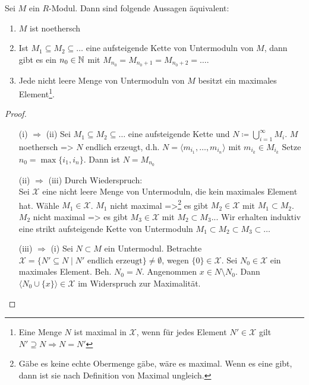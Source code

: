 \documentclass[../main.tex]{subfiles}
\begin{document}
\begin{theorem}\label{theo:5.42}
    Sei $M$ ein $R$-Modul. Dann sind folgende Aussagen äquivalent:
    \begin{enumerate}[label=(\roman*)]
        \item $M$ ist noethersch
        \item Ist $M_1\subseteq M_2\subseteq \dots$ eine aufsteigende Kette von Untermoduln von $M$, dann gibt es ein $n_0\in \mathbb{N}$ mit $M_{n_0} = M_{n_0+1} = M_{n_0+2}=\dots$.
        \item Jede nicht leere Menge von Untermoduln von $M$ besitzt ein maximales Element\footnote{Eine Menge $N$ ist maximal in $\mathcal{X}$, wenn für jedes Element $N'\in \mathcal{X}$ gilt $N'\supseteq N \Rightarrow N = N'$}.
    \end{enumerate}
\end{theorem}
\begin{proof} $ $
    \begin{itemize}
        \item[(i) $\Rightarrow$ (ii)]
        Sei $M_1\subseteq M_2\subseteq \dots$ eine aufsteigende Kette und $N\coloneqq \bigcup_{i=1}^\infty M_i$.
        $M$ noethersch => $N$ endlich erzeugt, d.h. $N=\langle m_{i_1},\dots, m_{i_n}\rangle$ mit $m_{i_k} \in M_{i_k}$
        Setze $n_0 = \max\{i_1,i_n\}$.
        Dann ist $N=M_{n_0}$
        \item[(ii) $\Rightarrow$ (iii)]
        Durch Wiederspruch:\\
        Sei $\mathcal{X}$ eine nicht leere Menge von Untermoduln, die kein maximales Element hat.
        Wähle $M_1\in \mathcal{X}$. $M_1$ nicht maximal
        =>\footnote{Gäbe es keine echte Obermenge gäbe, wäre es maximal. Wenn es eine gibt, dann ist sie nach Definition von Maximal ungleich.} es gibt $M_2\in \mathcal{X}$ mit $M_1\subset M_2$.
        $M_2$ nicht maximal => es gibt $M_3\in \mathcal{X}$ mit $M_2\subset M_3$...
        Wir erhalten induktiv eine strikt aufsteigende Kette von Untermoduln $M_1\subset M_2\subset M_3\subset \dots$ \Lightning
        \item[(iii) $\Rightarrow$ (i)] Sei $N\subset M$ ein Untermodul.
        Betrachte $\mathcal{X}=\{N'\subseteq N\mid N' \text{ endlich erzeugt}\} \neq\emptyset$, wegen $\{0\}\in \mathcal{X}$.
        Sei $N_0\in \mathcal{X}$ ein maximales Element.
        Beh. $N_0 = N$. Angenommen $x\in N\setminus N_0$.
        Dann $\langle N_0\cup \{x\}\rangle\in \mathcal{X}$ im Widerspruch zur Maximalität.
    \end{itemize}
\end{proof}
\end{document}
